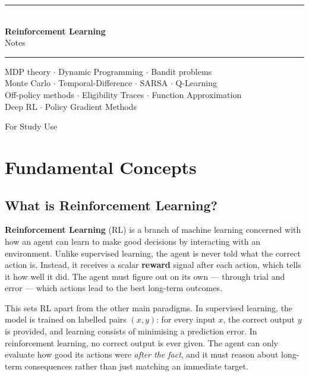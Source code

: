 \documentclass[11pt,a4paper]{article}
\newcommand{\term}[1]{\textcolor{DefGreen}{\textbf{#1}}}
\begin{document}

\begin{titlepage}
\centering\vspace*{3cm}
{\color{PrimaryBlue}\rule{\linewidth}{2pt}}\\[0.6em]
{\Huge\bfseries\color{PrimaryBlue} Reinforcement Learning}\\[0.4em]
{\Large\color{SubsectionColor} Notes}\\[0.3em]
{\color{PrimaryBlue}\rule{\linewidth}{2pt}}\vspace{1.5cm}
\begin{tcolorbox}[colback=LightBlue,colframe=AccentBlue,width=0.85\textwidth,boxrule=1pt,arc=4pt]
\centering\normalsize\color{NoteGray}
MDP theory $\cdot$ Dynamic Programming $\cdot$ Bandit problems\\
Monte Carlo $\cdot$ Temporal-Difference $\cdot$ SARSA $\cdot$ Q-Learning\\
Off-policy methods $\cdot$ Eligibility Traces $\cdot$ Function Approximation\\
Deep RL $\cdot$ Policy Gradient Methods
\end{tcolorbox}
\vfill{\color{NoteGray}\small For Study Use}
\end{titlepage}

\tableofcontents\newpage

\section{Fundamental Concepts}

\subsection{What is Reinforcement Learning?}

\term{Reinforcement Learning} (RL) is a branch of machine learning concerned with how an agent can learn to make good decisions by interacting with an environment. Unlike supervised learning, the agent is never told what the correct action is. Instead, it receives a scalar \term{reward} signal after each action, which tells it how well it did. The agent must figure out on its own --- through trial and error --- which actions lead to the best long-term outcomes.

This sets RL apart from the other main paradigms. In supervised learning, the model is trained on labelled pairs $(x, y)$: for every input $x$, the correct output $y$ is provided, and learning consists of minimising a prediction error. In reinforcement learning, no correct output is ever given. The agent can only evaluate how good its actions were \emph{after the fact}, and it must reason about long-term consequences rather than just matching an immediate target.
\end{document}
